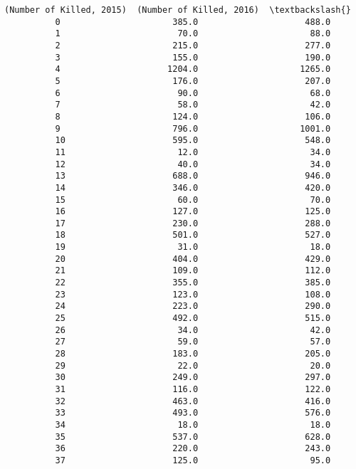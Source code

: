 \documentclass[11pt]{article}
\begin{document}
\begin{Verbatim}[commandchars=\\\{\}]
              (Number of Killed, 2015)  (Number of Killed, 2016)  \textbackslash{}
          0                      385.0                     488.0   
          1                       70.0                      88.0   
          2                      215.0                     277.0   
          3                      155.0                     190.0   
          4                     1204.0                    1265.0   
          5                      176.0                     207.0   
          6                       90.0                      68.0   
          7                       58.0                      42.0   
          8                      124.0                     106.0   
          9                      796.0                    1001.0   
          10                     595.0                     548.0   
          11                      12.0                      34.0   
          12                      40.0                      34.0   
          13                     688.0                     946.0   
          14                     346.0                     420.0   
          15                      60.0                      70.0   
          16                     127.0                     125.0   
          17                     230.0                     288.0   
          18                     501.0                     527.0   
          19                      31.0                      18.0   
          20                     404.0                     429.0   
          21                     109.0                     112.0   
          22                     355.0                     385.0   
          23                     123.0                     108.0   
          24                     223.0                     290.0   
          25                     492.0                     515.0   
          26                      34.0                      42.0   
          27                      59.0                      57.0   
          28                     183.0                     205.0   
          29                      22.0                      20.0   
          30                     249.0                     297.0   
          31                     116.0                     122.0   
          32                     463.0                     416.0   
          33                     493.0                     576.0   
          34                      18.0                      18.0   
          35                     537.0                     628.0   
          36                     220.0                     243.0   
          37                     125.0                      95.0   

\end{Verbatim}
\end{document}
